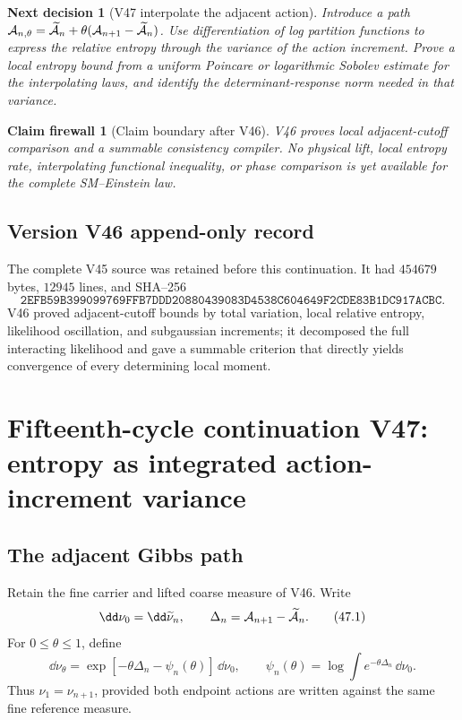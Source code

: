 \documentclass[11pt]{article}
\newtheorem{firewall}[theorem]{Claim firewall}
\newtheorem{decision}[theorem]{Next decision}
\theoremstyle{remark}
\begin{document}
\begin{decision}[V47 interpolate the adjacent action]
\label{dec:v15v46-next}
Introduce a path
\({\cal A}_{n,\theta}=\widetilde{\cal A}_n+
\theta({\cal A}_{n+1}-\widetilde{\cal A}_n)\).
Use differentiation of log partition functions to express the
relative entropy through the variance of the action increment.
Prove a local entropy bound from a uniform Poincare or logarithmic
Sobolev estimate for the interpolating laws, and identify the
determinant-response norm needed in that variance.
\end{decision}

\begin{firewall}[Claim boundary after V46]
\label{fire:v15v46}
V46 proves local adjacent-cutoff comparison and a summable
consistency compiler.  No physical lift, local entropy rate,
interpolating functional inequality, or phase comparison is yet
available for the complete SM--Einstein law.
\end{firewall}

\section*{Version V46 append-only record}
The complete V45 source was retained before this continuation.  It
had \(454679\) bytes, \(12945\) lines, and SHA--256
\[
 \texttt{2EFB59B399099769FFB7DDD20880439083D4538C604649F2CDE83B1DC917ACBC}.
\]
V46 proved adjacent-cutoff bounds by total variation, local relative
entropy, likelihood oscillation, and subgaussian increments; it
decomposed the full interacting likelihood and gave a summable
criterion that directly yields convergence of every determining
local moment.

\chapter{Fifteenth-cycle continuation V47: entropy as integrated action-increment variance}
\label{sec:v15v47}

\section{The adjacent Gibbs path}

Retain the fine carrier and lifted coarse measure of V46.  Write
\[
 \dd\nu_0=\dd\widetilde\nu_n,\qquad
 \Delta_n={\cal A}_{n+1}-\widetilde{\cal A}_n.           \tag{47.1}
\]
For \(0\leq\theta\leq1\), define
\[
 \dd\nu_\theta=
 \exp[-\theta\Delta_n-\psi_n(\theta)]\,\dd\nu_0,
 \qquad
 \psi_n(\theta)=
 \log\int e^{-\theta\Delta_n}\,\dd\nu_0.                \tag{47.2}
\]
Thus \(\nu_1=\nu_{n+1}\), provided both endpoint actions are written
against the same fine reference measure.
\end{document}
